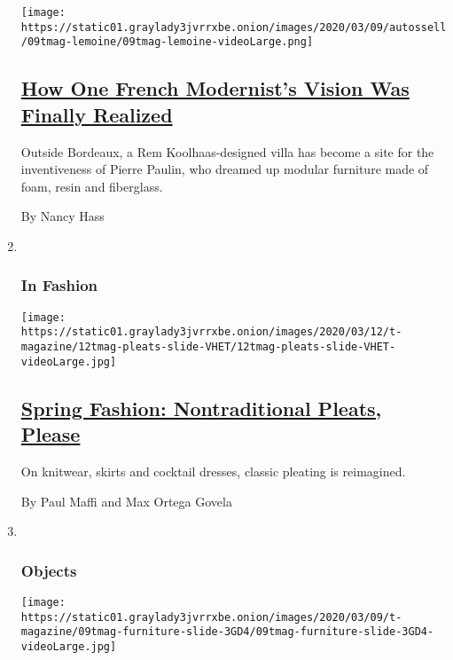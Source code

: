 \begin{enumerate}
  \texttt{[image: https://static01.graylady3jvrrxbe.onion/images/2020/03/09/autossell/09tmag-lemoine/09tmag-lemoine-videoLarge.png]}

  \hypertarget{how-one-french-modernists-vision-was-finally-realized}{%
  \subsection{\texorpdfstring{\href{/2020/03/11/t-magazine/rem-koolhaas-pierre-paulin.html}{How
  One French Modernist's Vision Was Finally
  Realized}}{How One French Modernist's Vision Was Finally Realized}}\label{how-one-french-modernists-vision-was-finally-realized}}

  Outside Bordeaux, a Rem Koolhaas-designed villa has become a site for
  the inventiveness of Pierre Paulin, who dreamed up modular furniture
  made of foam, resin and fiberglass.

  By Nancy Hass
\item ~
  \hypertarget{in-fashion}{%
  \subsubsection{In Fashion}\label{in-fashion}}

  \texttt{[image: https://static01.graylady3jvrrxbe.onion/images/2020/03/12/t-magazine/12tmag-pleats-slide-VHET/12tmag-pleats-slide-VHET-videoLarge.jpg]}

  \hypertarget{spring-fashion-nontraditional-pleats-please}{%
  \subsection{\texorpdfstring{\href{/2020/03/12/t-magazine/spring-fashion-pleats.html}{Spring
  Fashion: Nontraditional Pleats,
  Please}}{Spring Fashion: Nontraditional Pleats, Please}}\label{spring-fashion-nontraditional-pleats-please}}

  On knitwear, skirts and cocktail dresses, classic pleating is
  reimagined.

  By Paul Maffi and Max Ortega Govela
\item ~
  \hypertarget{objects}{%
  \subsubsection{Objects}\label{objects}}

  \texttt{[image: https://static01.graylady3jvrrxbe.onion/images/2020/03/09/t-magazine/09tmag-furniture-slide-3GD4/09tmag-furniture-slide-3GD4-videoLarge.jpg]}


\end{enumerate}
